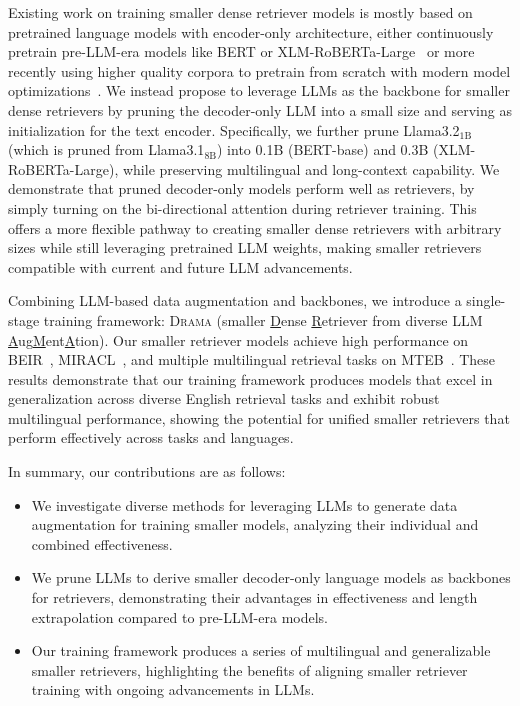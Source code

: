 \documentclass[]{fairmeta}
\newcommand{\ourmodel}{\textsc{Drama}}
\begin{document}
Existing work on training smaller dense retriever models is mostly based on pretrained language models with encoder-only architecture, either continuously pretrain pre-LLM-era models like BERT or XLM-RoBERTa-Large~\citep{wang-etal-2023-simlm,chen-etal-2024-m3} or more recently using higher quality corpora to pretrain from scratch with modern model optimizations~\citep{warner2024modernbert}.
We instead propose to leverage LLMs as the backbone for smaller dense retrievers by pruning the decoder-only LLM into a small size and serving as initialization for the text encoder.
Specifically, we further prune Llama3.2$_\text{1B}$ (which is pruned from Llama3.1$_\text{8B}$) into 0.1B (BERT-base) and 0.3B (XLM-RoBERTa-Large), while preserving multilingual and long-context capability.
We demonstrate that pruned decoder-only models perform well as retrievers, by simply turning on the bi-directional attention during retriever training.
This offers a more flexible pathway to creating smaller dense retrievers with arbitrary sizes while still leveraging pretrained LLM weights, making smaller retrievers compatible with current and future LLM advancements.


Combining LLM-based data augmentation and backbones, we introduce a single-stage training framework: \ourmodel{} (smaller \underline{D}ense \underline{R}etriever from diverse LLM \underline{A}ug\underline{M}ent\underline{A}tion).
Our smaller retriever models achieve high performance on BEIR~\citep{thakur2021beir}, MIRACL~\citep{miracl}, and multiple multilingual retrieval tasks on MTEB~\citep{muennighoff2022mteb}.
These results demonstrate that our training framework produces models that excel in generalization across diverse English retrieval tasks and exhibit robust multilingual performance, showing the potential for unified smaller retrievers that perform effectively across tasks and languages.

In summary, our contributions are as follows:
\begin{itemize}
    \item We investigate diverse methods for leveraging LLMs to generate data augmentation for training smaller models, analyzing their individual and combined effectiveness.
    \item We prune LLMs to derive smaller decoder-only language models as backbones for retrievers, demonstrating their advantages in effectiveness and length extrapolation compared to pre-LLM-era models.
    \item Our training framework produces a series of multilingual and generalizable smaller retrievers, highlighting the benefits of aligning smaller retriever training with ongoing advancements in LLMs.
\end{itemize}
\end{document}
